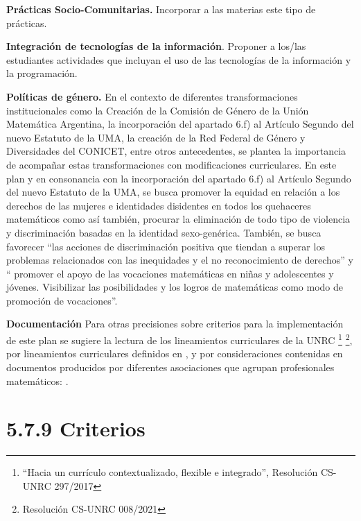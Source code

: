 \documentclass[a4paper, 12pt]{article}
\begin{document}
\begin{description}
\item{\textbf{Prácticas Socio-Comunitarias.} } Incorporar a las materias este tipo de prácticas.


\item{ \textbf{Integración de tecnologías de la información}.} Proponer a los/las estudiantes actividades que incluyan el uso de las tecnologías de la información y la programación.  



\item{\textbf{Políticas de género.}}
En el contexto de diferentes transformaciones institucionales como la Creación de la Comisión de Género de la Unión Matemática Argentina, la incorporación del apartado 6.f) al Artículo Segundo del nuevo Estatuto de la UMA, la creación de la Red Federal de Género y Diversidades del CONICET, entre otros antecedentes, se plantea la importancia de acompañar estas transformaciones con  modificaciones curriculares. 
En este plan y en consonancia con la incorporación del apartado 6.f) al Artículo Segundo del nuevo Estatuto de la UMA, se  busca promover la equidad en relación a los derechos de las mujeres e identidades disidentes en todos los quehaceres matemáticos  como así también,  procurar la eliminación de todo tipo de violencia y discriminación basadas en la identidad sexo-genérica.
También, se busca favorecer “las acciones de discriminación positiva que tiendan a superar los problemas relacionados con las inequidades y el no reconocimiento de derechos”  y    “ promover el apoyo de las vocaciones matemáticas en niñas y adolescentes y jóvenes. Visibilizar las posibilidades y los logros de matemáticas como modo de promoción de vocaciones”.
 
 \item{\textbf{Documentación}} Para otras precisiones sobre criterios para la implementación de este plan se sugiere la lectura de los lineamientos curriculares de la UNRC \footnote{``Hacia   un   currículo contextualizado, flexible e integrado'', Resolución CS-UNRC 297/2017 }
\footnote{ Resolución CS-UNRC 008/2021}, por lineamientos curriculares definidos en  \cite{paniagua2013educacion}, y por consideraciones contenidas en documentos producidos por diferentes asociaciones que agrupan profesionales matemáticos: \cite{uma,society1996siam,society2012siam,damlamian2013educational}.

\end{description}




\section*{5.7.9 Criterios}  
\end{document}
